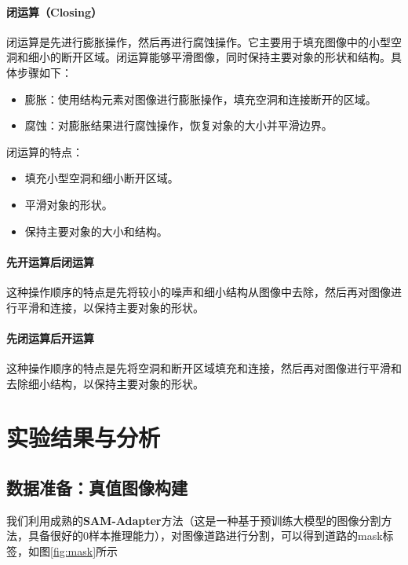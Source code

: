 \documentclass[12pt,hyperref,a4paper,UTF8]{ctexart}
\begin{document}
\paragraph{闭运算（Closing）}
闭运算是先进行膨胀操作，然后再进行腐蚀操作。它主要用于填充图像中的小型空洞和细小的断开区域。闭运算能够平滑图像，同时保持主要对象的形状和结构。具体步骤如下：
\begin{itemize}
\item 膨胀：使用结构元素对图像进行膨胀操作，填充空洞和连接断开的区域。
\item 腐蚀：对膨胀结果进行腐蚀操作，恢复对象的大小并平滑边界。
\end{itemize}

闭运算的特点：
\begin{itemize}
\item 填充小型空洞和细小断开区域。
\item 平滑对象的形状。
\item 保持主要对象的大小和结构。
\end{itemize}

\paragraph{先开运算后闭运算}
这种操作顺序的特点是先将较小的噪声和细小结构从图像中去除，然后再对图像进行平滑和连接，以保持主要对象的形状。
\paragraph{先闭运算后开运算}
这种操作顺序的特点是先将空洞和断开区域填充和连接，然后再对图像进行平滑和去除细小结构，以保持主要对象的形状。


\section{实验结果与分析}

\subsection{数据准备：真值图像构建}

我们利用成熟的\textbf{SAM-Adapter}方法（这是一种基于预训练大模型的图像分割方法，具备很好的0样本推理能力），对图像道路进行分割，可以得到道路的mask标签，如图\ref{fig:mask}所示
\end{document}
